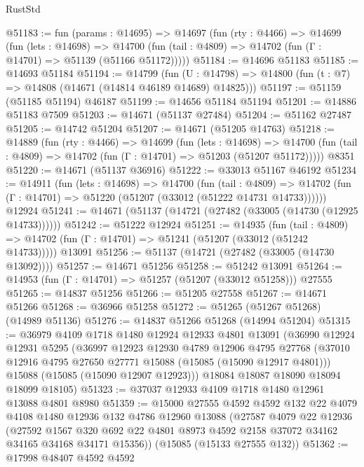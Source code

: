 \begin{lexlean}{RustStd}
\begin{coremodule}
@51183 := fun (params : @14695) =>
  @14697
    (fun (rty : @4466) =>
    @14699
      (fun (lets : @14698) =>
      @14700 (fun (tail : @4809) => @14702 (fun (Γ : @14701) => @51139 (@51166 @51172)))))
@51184 := @14696 @51183
@51185 := @14693 @51184
@51194 := @14799
    (fun (U : @14798) => @14800 (fun (t : @7) => @14808 (@14671 (@14814 @46189 @14689) @14825)))
@51197 := @51159 (@51185 @51194) @46187
@51199 := @14656 @51184 @51194
@51201 := @14886 @51183 @7509
@51203 := @14671 (@51137 @27484)
@51204 := @51162 @27487
@51205 := @14742 @51204
@51207 := @14671 (@51205 @14763)
@51218 := @14889
    (fun (rty : @4466) =>
    @14699
      (fun (lets : @14698) =>
      @14700 (fun (tail : @4809) => @14702 (fun (Γ : @14701) => @51203 (@51207 @51172)))))
    @8351
@51220 := @14671 (@51137 @36916)
@51222 := @33013 @51167 @46192
@51234 := @14911
    (fun (lets : @14698) =>
    @14700
      (fun (tail : @4809) =>
      @14702 (fun (Γ : @14701) => @51220 (@51207 (@33012 (@51222 @14731 @14733))))))
    @12924
@51241 := @14671 (@51137 (@14721 (@27482 (@33005 (@14730 (@12925 @14733))))))
@51242 := @51222 @12924
@51251 := @14935
    (fun (tail : @4809) => @14702 (fun (Γ : @14701) => @51241 (@51207 (@33012 (@51242 @14733)))))
    @13091
@51256 := @51137 (@14721 (@27482 (@33005 (@14730 @13092))))
@51257 := @14671 @51256
@51258 := @51242 @13091
@51264 := @14953 (fun (Γ : @14701) => @51257 (@51207 (@33012 @51258))) @27555
@51265 := @14837 @51256
@51266 := @51205 @27558
@51267 := @14671 @51266
@51268 := @36966 @51258
@51272 := @51265 (@51267 @51268) (@14989 @51136)
@51276 := @14837 @51266 @51268 (@14994 @51204)
@51315 := @36979
    @4109
    @1718
    @1480
    @12924
    @12933
    @4801
    @13091
    (@36990
      @12924
      @12931
      @5295
      (@36997
        @12923
        @12930
        @4789
        @12906
        @4795
        @27768
        (@37010 @12916 @4795 @27650 @27771 @15088 (@15085 (@15090 @12917 @4801)))
        @15088
        (@15085 (@15090 @12907 @12923)))
      @18084
      @18087
      @18090
      @18094
      @18099
      @18105)
@51323 := @37037 @12933 @4109 @1718 @1480 @12961 @13088 @4801 @8980
@51359 := @15000
    @27555
    @4592
    @4592
    @132
    @22
    @4079
    @4108
    @1480
    @12936
    @132
    @4786
    @12960
    @13088
    (@27587
      @4079
      @22
      @12936
      (@27592
        @1567
        @320
        @692
        @22
        @4801
        @8973
        @4592
        @2158
        @37072
        @34162
        @34165
        @34168
        @34171
        @15356))
    (@15085 (@15133 @27555 @132))
@51362 := @17998 @48407 @4592 @4592

\end{coremodule}
\end{lexlean}
